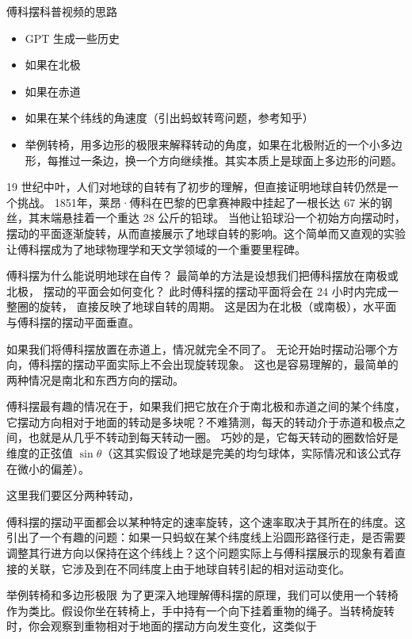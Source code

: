 
\begin{issues}
\issueDraft
\end{issues}

傅科摆科普视频的思路
\begin{itemize}
\item GPT 生成一些历史
\item 如果在北极
\item 如果在赤道
\item 如果在某个纬线的角速度（引出蚂蚁转弯问题，参考知乎）
\item 举例转椅，用多边形的极限来解释转动的角度，如果在北极附近的一个小多边形，每推过一条边，换一个方向继续推。其实本质上是球面上多边形的问题。
\end{itemize}

19 世纪中叶，人们对地球的自转有了初步的理解，但直接证明地球自转仍然是一个挑战。 1851年，莱昂·傅科在巴黎的巴拿赛神殿中挂起了一根长达 67 米的钢丝，其末端悬挂着一个重达 28 公斤的铅球。 当他让铅球沿一个初始方向摆动时，摆动的平面逐渐旋转，从而直接展示了地球自转的影响。这个简单而又直观的实验让傅科摆成为了地球物理学和天文学领域的一个重要里程碑。

傅科摆为什么能说明地球在自传？ 最简单的方法是设想我们把傅科摆放在南极或北极， 摆动的平面会如何变化？ 此时傅科摆的摆动平面将会在 24 小时内完成一整圈的旋转， 直接反映了地球自转的周期。 这是因为在北极（或南极），水平面与傅科摆的摆动平面垂直。

如果我们将傅科摆放置在赤道上，情况就完全不同了。 无论开始时摆动沿哪个方向，傅科摆的摆动平面实际上不会出现旋转现象。 这也是容易理解的，最简单的两种情况是南北和东西方向的摆动。

傅科摆最有趣的情况在于，如果我们把它放在介于南北极和赤道之间的某个纬度，它摆动方向相对于地面的转动是多块呢？不难猜测，每天的转动介于赤道和极点之间，也就是从几乎不转动到每天转动一圈。 巧妙的是，它每天转动的圈数恰好是维度的正弦值 $\sin\theta$（这其实假设了地球是完美的均匀球体，实际情况和该公式存在微小的偏差）。

这里我们要区分两种转动，

傅科摆的摆动平面都会以某种特定的速率旋转，这个速率取决于其所在的纬度。这引出了一个有趣的问题：如果一只蚂蚁在某个纬度线上沿圆形路径行走，是否需要调整其行进方向以保持在这个纬线上？这个问题实际上与傅科摆展示的现象有着直接的关联，它涉及到在不同纬度上由于地球自转引起的相对运动变化。

举例转椅和多边形极限
为了更深入地理解傅科摆的原理，我们可以使用一个转椅作为类比。假设你坐在转椅上，手中持有一个向下挂着重物的绳子。当转椅旋转时，你会观察到重物相对于地面的摆动方向发生变化，这类似于
